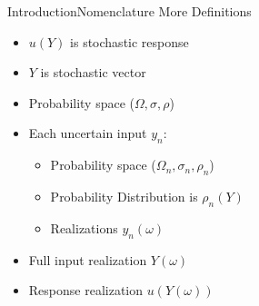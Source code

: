 \documentclass{beamer}
\begin{document}
\begin{frame}{Introduction}{Nomenclature}\vspace{-10pt}
  More Definitions
  \vfill
  \begin{itemize}
    \item $u(Y)$ is stochastic response
  \vfill
    \item $Y$ is stochastic vector
    \item Probability space ($\Omega,\sigma,\rho$)
  \vfill
    \item Each uncertain input $y_n$:
      \begin{itemize}
        \item Probability space ($\Omega_n,\sigma_n,\rho_n$)
        \item Probability Distribution is $\rho_n(Y)$
        \item Realizations $y_n(\omega)$
      \end{itemize}
    \item Full input realization $Y(\omega)$
    \item Response realization $u(Y(\omega))$
  \end{itemize}
  \vfill
\end{frame}
\end{document}
